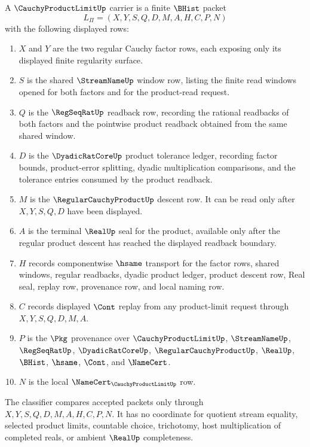 \begin{definition}
\label{def:cauchy-product-limit-carrier}
A $\CauchyProductLimitUp$ carrier is a finite $\BHist$ packet
$$
L_{\Pi}=(X,Y,S,Q,D,M,A,H,C,P,N)
$$
with the following displayed rows:
\begin{enumerate}
\item $X$ and $Y$ are the two regular Cauchy factor rows, each exposing only its displayed finite regularity surface.
\item $S$ is the shared $\StreamNameUp$ window row, listing the finite read windows opened for both factors and for the product-read request.
\item $Q$ is the $\RegSeqRatUp$ readback row, recording the rational readbacks of both factors and the pointwise product readback obtained from the same shared window.
\item $D$ is the $\DyadicRatCoreUp$ product tolerance ledger, recording factor bounds, product-error splitting, dyadic multiplication comparisons, and the tolerance entries consumed by the product readback.
\item $M$ is the $\RegularCauchyProductUp$ descent row. It can be read only after $X,Y,S,Q,D$ have been displayed.
\item $A$ is the terminal $\RealUp$ seal for the product, available only after the regular product descent has reached the displayed readback boundary.
\item $H$ records componentwise $\hsame$ transport for the factor rows, shared windows, regular readbacks, dyadic product ledger, product descent row, Real seal, replay row, provenance row, and local naming row.
\item $C$ records displayed $\Cont$ replay from any product-limit request through $X,Y,S,Q,D,M,A$.
\item $P$ is the $\Pkg$ provenance over $\CauchyProductLimitUp$, $\StreamNameUp$, $\RegSeqRatUp$, $\DyadicRatCoreUp$, $\RegularCauchyProductUp$, $\RealUp$, $\BHist$, $\hsame$, $\Cont$, and $\NameCert$.
\item $N$ is the local $\NameCert_{\CauchyProductLimitUp}$ row.
\end{enumerate}
The classifier compares accepted packets only through $X,Y,S,Q,D,M,A,H,C,P,N$. It has no coordinate for quotient stream equality, selected product limits, countable choice, trichotomy, host multiplication of completed reals, or ambient $\RealUp$ completeness.
\end{definition}

